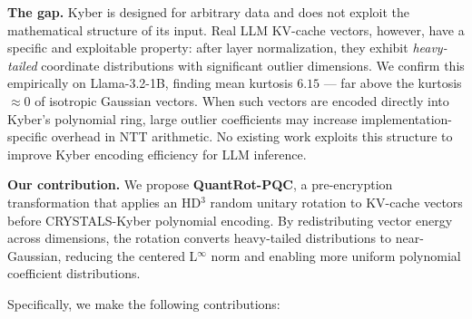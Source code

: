 \documentclass[preprint,a4paper]{article}
\begin{document}
\textbf{The gap.}
Kyber is designed for arbitrary data and does not
exploit the mathematical structure of its input.
Real LLM KV-cache vectors, however, have a specific
and exploitable property: after layer normalization,
they exhibit \emph{heavy-tailed} coordinate
distributions with significant outlier dimensions.
We confirm this empirically on Llama-3.2-1B,
finding mean kurtosis $6.15$ --- far above the
kurtosis $\approx 0$ of isotropic Gaussian vectors.
When such vectors are encoded directly into Kyber's
polynomial ring, large outlier coefficients may
increase implementation-specific overhead in
NTT arithmetic. No existing work exploits this
structure to improve Kyber encoding efficiency
for LLM inference.

\textbf{Our contribution.}
We propose \textbf{QuantRot-PQC}, a pre-encryption
transformation that applies an HD$^3$ random unitary
rotation to KV-cache vectors before CRYSTALS-Kyber
polynomial encoding. By redistributing vector energy
across dimensions, the rotation converts heavy-tailed
distributions to near-Gaussian, reducing the
centered L$^\infty$ norm and enabling more uniform
polynomial coefficient distributions.

Specifically, we make the following contributions:
\end{document}
